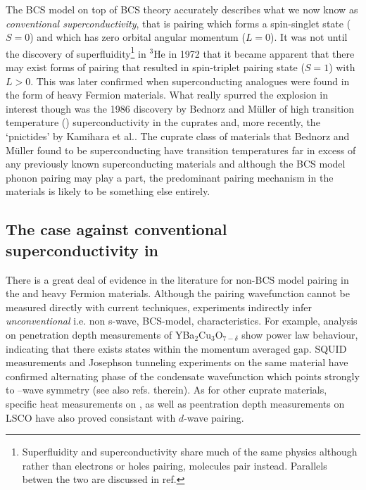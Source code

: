 The BCS model on top of BCS theory accurately describes what we now know as \textit{conventional superconductivity}, that is pairing which forms a spin-singlet state ($S=0$) and which has zero orbital angular momentum ($L=0$). It was not until the discovery of superfluidity\footnote{Superfluidity and superconductivity share much of the same physics although rather than electrons or holes pairing, molecules pair instead. Parallels betwen the two are discussed in ref.\cite{Annett2010}} in $^3$He in 1972\cite{Osheroff1972} that it became apparent that there may exist forms of pairing that resulted in spin-triplet pairing state ($S=1$) with $L>0$. This was later confirmed when superconducting analogues were found in the form of heavy Fermion materials. What really spurred the explosion in interest though was the 1986 discovery by Bednorz and M\"uller\cite{Bednorz} of high transition temperature (\Tc) superconductivity in the cuprates and, more recently, the `pnictides' by Kamihara et al.\cite{Kamihara2008}. The cuprate class of materials that Bednorz and M\"uller found to be superconducting have transition temperatures far in excess of any previously known superconducting materials and although the BCS model phonon pairing may play a part, the predominant pairing mechanism in the \highTc materials is likely to be something else entirely.

\subsection{The case against conventional superconductivity in \highTc}

There is a great deal of evidence in the literature for non-BCS model pairing in the \highTc and heavy Fermion materials. Although the pairing wavefunction cannot be measured directly with current techniques, experiments indirectly infer \textit{unconventional} i.e. non s-wave, BCS-model, characteristics. For example, analysis on penetration depth measurements of YBa$_2$Cu$_3$O$_{7-\delta}$ show power law behaviour\cite{Annett1991}, indicating that there exists states within the momentum averaged gap. SQUID measurements and Josephson tunneling experiments on the same material have confirmed alternating phase of the condensate wavefunction which points strongly to \DxTwoyTwo--wave symmetry\cite{VanHarlingen1994} (see also refs. therein). As for other cuprate materials, specific heat measurements on \BSCO\cite{Wang2011}, as well as peentration depth measurements on LSCO\cite{Froehlich1996} have also proved consistant with $d$-wave pairing. 

